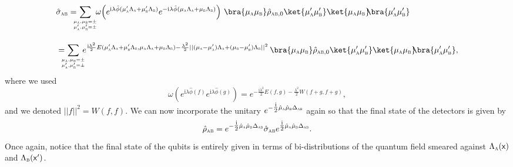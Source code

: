 \documentclass[letterpaper,12pt,titlepage,oneside,final]{book}
\newcommand{\mf}{\mathsf}%
\newcommand{\ii}{\mathrm{i}}
\newcommand{\tc}[1]{\textsc{#1}}
\begin{document}
\begin{align}
    &\hat{\sigma}_\tc{ab} 
    =\!\!\!\!\sum_{{\substack{{}_{\mu_\tc{a},\mu_\tc{b} = \pm}\\{}_{\mu_\tc{a}',\mu_\tc{b}' = \pm}}}} \!\!\omega\!\left(e^{\ii \lambda\hat{\phi}({\mu}_\tc{a}'\Lambda_\tc{a}+{\mu}_\tc{b}'\Lambda_\tc{b})}e^{- \ii \lambda\hat{\phi}({\mu}_\tc{a}\Lambda_\tc{a}+{\mu}_\tc{b}\Lambda_\tc{b})}\right)\,\bra{\mu_\tc{a}\mu_{\tc{b}}}\hat{\rho}_{\tc{ab},0}\ket{\mu_\tc{a}'\mu_{\tc{b}}'}  \ket{\mu_\tc{a}\mu_{\tc{b}}}\!\!\bra{\mu_\tc{a}'\mu_{\tc{b}}'}\nonumber\\[10pt]
    &=\!\!\!\!\sum_{{\substack{{}_{\mu_\tc{a},\mu_\tc{b} = \pm}\\{}_{\mu_\tc{a}',\mu_\tc{b}' = \pm}}}} \!\!\! e^{\frac{\ii\lambda^2}{2}E(\mu_\tc{a}'\Lambda_\tc{a} + \mu_{\tc{b}}'\Lambda_\tc{b},\mu_\tc{a}\Lambda_\tc{a} + \mu_{\tc{b}}\Lambda_\tc{b})- \frac{\lambda^2}{2}||(\mu_{\tc{a}} - \mu_{\tc{a}}')\Lambda_{\tc{a}} + (\mu_{\tc{b}} - \mu_{\tc{b}}')\Lambda_{\tc{b}}||^2}\nonumber\,\bra{\mu_\tc{a}\mu_{\tc{b}}}\hat{\rho}_{\tc{ab},0}\ket{\mu_\tc{a}'\mu_{\tc{b}}'}  \ket{\mu_\tc{a}\mu_{\tc{b}}}\!\!\bra{\mu_\tc{a}'\mu_{\tc{b}}'},
\end{align}
where we used
\begin{equation}
    \omega\left(e^{\ii \lambda \hat{\phi}(f)}e^{\ii \lambda \hat{\phi}(g)}\right) = e^{-\frac{\ii \lambda^2}{2}E(f,g) - \frac{\lambda^2}{2} W(f+g,f+g)},
\end{equation}
and we denoted $||f||^2 = W(f,f)$. We can now incorporate the unitary $e^{-  \tfrac{\ii}{2}\hat{\mu}_\tc{a}\hat{\mu}_\tc{b}\Delta_\tc{ab}}$ again so that the final state of the detectors is given by
\begin{equation}
    \hat{\rho}_\tc{ab} = e^{-  \tfrac{\ii}{2}\hat{\mu}_\tc{a}\hat{\mu}_\tc{b}\Delta_\tc{ab}} \hat{\sigma}_\tc{ab}e^{\tfrac{\ii}{2}\hat{\mu}_\tc{a}\hat{\mu}_\tc{b}\Delta_\tc{ab}}.\label{eq:sab}
\end{equation} 
Once again, notice that the final state of the qubits is entirely given in terms of bi-distributions of the quantum field smeared against $\Lambda_\tc{a}(\mf x)$ and $\Lambda_{\tc b}(\mf x')$. 
\end{document}
